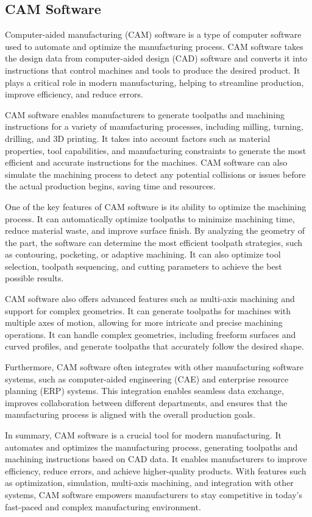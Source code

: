\subsection{CAM Software}
Computer-aided manufacturing (CAM) software is a type of computer software used to automate and optimize the manufacturing process. CAM software takes the design data from computer-aided design (CAD) software and converts it into instructions that control machines and tools to produce the desired product. It plays a critical role in modern manufacturing, helping to streamline production, improve efficiency, and reduce errors.

CAM software enables manufacturers to generate toolpaths and machining instructions for a variety of manufacturing processes, including milling, turning, drilling, and 3D printing. It takes into account factors such as material properties, tool capabilities, and manufacturing constraints to generate the most efficient and accurate instructions for the machines. CAM software can also simulate the machining process to detect any potential collisions or issues before the actual production begins, saving time and resources.

One of the key features of CAM software is its ability to optimize the machining process. It can automatically optimize toolpaths to minimize machining time, reduce material waste, and improve surface finish. By analyzing the geometry of the part, the software can determine the most efficient toolpath strategies, such as contouring, pocketing, or adaptive machining. It can also optimize tool selection, toolpath sequencing, and cutting parameters to achieve the best possible results.

CAM software also offers advanced features such as multi-axis machining and support for complex geometries. It can generate toolpaths for machines with multiple axes of motion, allowing for more intricate and precise machining operations. It can handle complex geometries, including freeform surfaces and curved profiles, and generate toolpaths that accurately follow the desired shape.

Furthermore, CAM software often integrates with other manufacturing software systems, such as computer-aided engineering (CAE) and enterprise resource planning (ERP) systems. This integration enables seamless data exchange, improves collaboration between different departments, and ensures that the manufacturing process is aligned with the overall production goals.

In summary, CAM software is a crucial tool for modern manufacturing. It automates and optimizes the manufacturing process, generating toolpaths and machining instructions based on CAD data. It enables manufacturers to improve efficiency, reduce errors, and achieve higher-quality products. With features such as optimization, simulation, multi-axis machining, and integration with other systems, CAM software empowers manufacturers to stay competitive in today's fast-paced and complex manufacturing environment.
